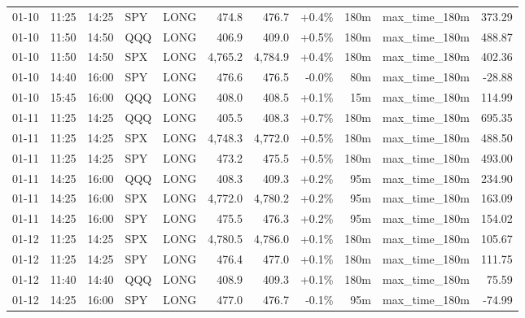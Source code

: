 \documentclass[11pt,a4paper,twoside]{article}
\begin{document}
\begin{center}
\begin{longtable}{>{\color{txtmain}}l l l l l r r r r >{\color{txtmain}}l r}
01-10 & 11:25 & 14:25 & SPY & LONG & 474.8 & 476.7 & \textcolor{wingreen}{+0.4\%} & 180m & max\_time\_180m & \textcolor{wingreen}{373.29} \\
01-10 & 11:50 & 14:50 & QQQ & LONG & 406.9 & 409.0 & \textcolor{wingreen}{+0.5\%} & 180m & max\_time\_180m & \textcolor{wingreen}{488.87} \\
01-10 & 11:50 & 14:50 & SPX & LONG & 4,765.2 & 4,784.9 & \textcolor{wingreen}{+0.4\%} & 180m & max\_time\_180m & \textcolor{wingreen}{402.36} \\
01-10 & 14:40 & 16:00 & SPY & LONG & 476.6 & 476.5 & \textcolor{lossred}{-0.0\%} & 80m & max\_time\_180m & \textcolor{lossred}{-28.88} \\
01-10 & 15:45 & 16:00 & QQQ & LONG & 408.0 & 408.5 & \textcolor{wingreen}{+0.1\%} & 15m & max\_time\_180m & \textcolor{wingreen}{114.99} \\
01-11 & 11:25 & 14:25 & QQQ & LONG & 405.5 & 408.3 & \textcolor{wingreen}{+0.7\%} & 180m & max\_time\_180m & \textcolor{wingreen}{695.35} \\
01-11 & 11:25 & 14:25 & SPX & LONG & 4,748.3 & 4,772.0 & \textcolor{wingreen}{+0.5\%} & 180m & max\_time\_180m & \textcolor{wingreen}{488.50} \\
01-11 & 11:25 & 14:25 & SPY & LONG & 473.2 & 475.5 & \textcolor{wingreen}{+0.5\%} & 180m & max\_time\_180m & \textcolor{wingreen}{493.00} \\
01-11 & 14:25 & 16:00 & QQQ & LONG & 408.3 & 409.3 & \textcolor{wingreen}{+0.2\%} & 95m & max\_time\_180m & \textcolor{wingreen}{234.90} \\
01-11 & 14:25 & 16:00 & SPX & LONG & 4,772.0 & 4,780.2 & \textcolor{wingreen}{+0.2\%} & 95m & max\_time\_180m & \textcolor{wingreen}{163.09} \\
01-11 & 14:25 & 16:00 & SPY & LONG & 475.5 & 476.3 & \textcolor{wingreen}{+0.2\%} & 95m & max\_time\_180m & \textcolor{wingreen}{154.02} \\
01-12 & 11:25 & 14:25 & SPX & LONG & 4,780.5 & 4,786.0 & \textcolor{wingreen}{+0.1\%} & 180m & max\_time\_180m & \textcolor{wingreen}{105.67} \\
01-12 & 11:25 & 14:25 & SPY & LONG & 476.4 & 477.0 & \textcolor{wingreen}{+0.1\%} & 180m & max\_time\_180m & \textcolor{wingreen}{111.75} \\
01-12 & 11:40 & 14:40 & QQQ & LONG & 408.9 & 409.3 & \textcolor{wingreen}{+0.1\%} & 180m & max\_time\_180m & \textcolor{wingreen}{75.59} \\
01-12 & 14:25 & 16:00 & SPY & LONG & 477.0 & 476.7 & \textcolor{lossred}{-0.1\%} & 95m & max\_time\_180m & \textcolor{lossred}{-74.99} \\

\end{longtable}
\end{center}
\end{document}
